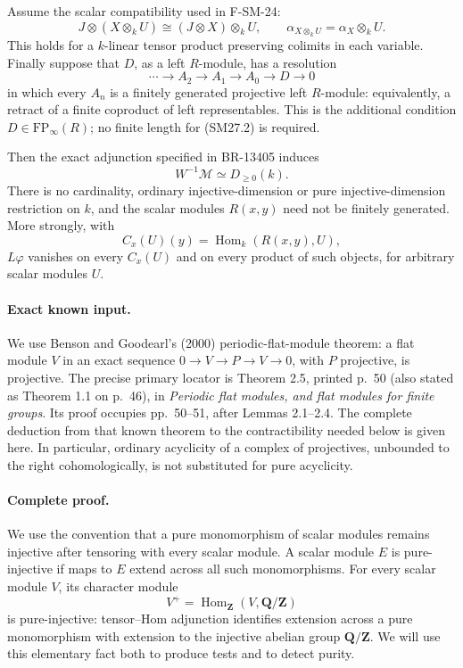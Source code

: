 Assume the scalar compatibility used in F-SM-24:
\[
 J\otimes(X\otimes_kU)\cong(J\otimes X)\otimes_kU,\qquad
 \alpha_{X\otimes_kU}=\alpha_X\otimes_kU.
 \tag{SM27.1}
\]
This holds for a \(k\)-linear tensor product preserving colimits in each
variable.  Finally suppose that \(D\), as a left \(R\)-module, has a
resolution
\[
 \cdots\longrightarrow A_2\longrightarrow A_1
 \longrightarrow A_0\longrightarrow D\longrightarrow0
 \tag{SM27.2}
\]
in which every \(A_n\) is a finitely generated projective left
\(R\)-module: equivalently, a retract of a finite coproduct of left
representables.  This is the additional condition
\(D\in\mathrm{FP}_\infty(R)\); no finite length for (SM27.2) is required.

Then the exact adjunction specified in BR-13405 induces
\[
 W^{-1}\mathcal M\simeq D_{\ge0}(k).
 \tag{SM27.3}
\]
There is no cardinality, ordinary injective-dimension or pure
injective-dimension restriction on \(k\), and the scalar modules
\(R(x,y)\) need not be finitely generated.  More strongly, with
\[
 C_x(U)(y)=\operatorname{Hom}_k(R(x,y),U),
 \tag{SM27.4}
\]
\(L\varphi\) vanishes on every \(C_x(U)\) and on every product of such
objects, for arbitrary scalar modules \(U\).

\paragraph{Exact known input.}
We use Benson and Goodearl's (2000) periodic-flat-module theorem:
a flat module \(V\) in an exact sequence
\(0\to V\to P\to V\to0\), with \(P\) projective, is projective.
The precise primary locator is Theorem 2.5, printed p.~50
(also stated as Theorem 1.1 on p.~46), in
\emph{Periodic flat modules, and flat modules for finite groups}.
Its proof occupies pp.~50--51, after Lemmas 2.1--2.4.
The complete deduction from that known theorem to the contractibility
needed below is given here.  In particular, ordinary acyclicity of a
complex of projectives, unbounded to the right cohomologically, is
not substituted for pure acyclicity.

\paragraph{Complete proof.}
We use the convention that a pure monomorphism of scalar modules
remains injective after tensoring with every scalar module.
A scalar module \(E\) is pure-injective if maps to \(E\) extend across
all such monomorphisms.  For every scalar module \(V\), its character
module
\[
 V^+=\operatorname{Hom}_{\mathbf Z}(V,\mathbf Q/\mathbf Z)
\]
is pure-injective: tensor--Hom adjunction identifies extension across
a pure monomorphism with extension to the injective abelian group
\(\mathbf Q/\mathbf Z\).  We will use this elementary fact both to
produce tests and to detect purity.

